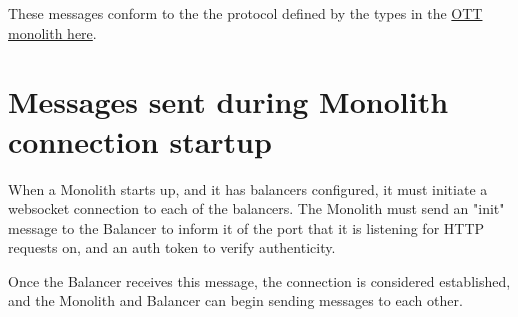These messages conform to the the protocol defined by the types in the \href{https://github.com/dyc3/opentogethertube/blob/master/common/models/messages.ts}{OTT monolith here}.

\section{Messages sent during Monolith connection startup}

When a Monolith starts up, and it has balancers configured, it must initiate a websocket connection to each of the balancers. The Monolith must send an "init" message to the Balancer to inform it of the port that it is listening for HTTP requests on, and an auth token to verify authenticity.

Once the Balancer receives this message, the connection is considered established, and the Monolith and Balancer can begin sending messages to each other.